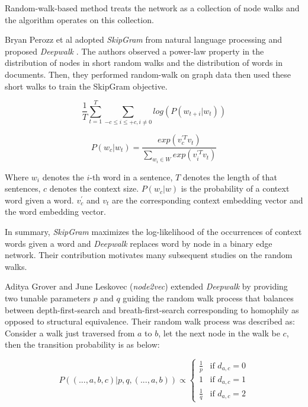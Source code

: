 Random-walk-based method treats the network as a collection of node walks and the algorithm operates on this collection.

Bryan Perozz et al adopted \emph{SkipGram} \cite{mikolov2013distributed} from natural language processing and proposed \emph{Deepwalk} \cite{perozzi2014deepwalk}. The authors observed a power-law property in the distribution of nodes in short random walks and the distribution of words in documents. Then, they performed random-walk on graph data then used these short walks to train the SkipGram objective.

\begin{equation}
    \frac{1}{T} \sum_{t=1}^T \sum_{-c \leq i \leq +c, i \neq 0} log(P(w_{t+i} | w_t))
\end{equation}

\begin{equation}
    P(w_c | w_t) = \frac{exp(v_c^{'T} v_t)}{\sum_{w_i \in W} exp(v_i^{'T} v_t)}
    \label{eq:softmax}
\end{equation}

Where $w_i$ denotes the $i$-th word in a sentence, $T$ denotes the length of that sentences, $c$ denotes the context size. $P(w_c | w)$ is the probability of a context word given a word. $v_c^{'}$ and $v_t$ are the corresponding context embedding vector and the word embedding vector.

In summary, \emph{SkipGram} maximizes the log-likelihood of the occurrences of context words given a word and \emph{Deepwalk} replaces  word by node in a binary edge network. Their contribution motivates many subsequent studies on the random walks.

Aditya Grover and June Leskovec (\emph{node2vec}) extended \emph{Deepwalk} by providing two tunable parameters $p$ and $q$ guiding the random walk process that balances between depth-first-search and breath-first-search corresponding to homophily as opposed to structural equivalence. Their random walk process was described as: Consider a walk just traversed from $a$ to $b$, let the next node in the walk be $c$, then the transition probability is as below:

\begin{equation}
     P((..., a, b, c) | p, q, (..., a, b)) \propto \left\{
    \begin{array}{ll}
        \frac{1}{p} \;\;\; \text{if $d_{a, c} = 0$} \\
        1  \;\;\; \text{if $d_{a, c} = 1$} \\
        \frac{1}{q} \;\;\; \text{if $d_{a, c} = 2$}
    \end{array}
    \right.
\end{equation}

